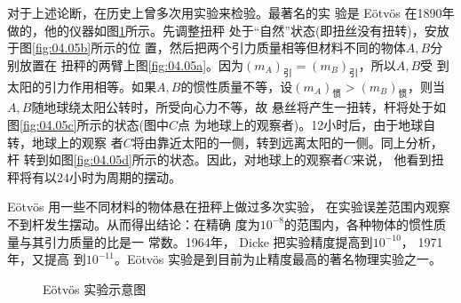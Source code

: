 对于上述论断，在历史上曾多次用实验来检验。最著名的实
验是 E\"otv\"os 在1890年做的，他的仪器如图\ref{fig:04.05}所示。先调整扭秤
处于“自然”状态(即扭丝没有扭转)，安放于图\ref{fig:04.05b}所示的位
置，然后把两个引力质量相等但材料不同的物体$ A, B $分别放置在
扭秤的两臂上\lhbrak 图\ref{fig:04.05a}\rhbrak 。因为$\left(m _ { A }\right) _ {\text{引}} = \left(m _ { B }\right) _ {\text{引}} $，所以$ A , B $受
到太阳的引力作用相等。如果$ A , B $的惯性质量不等，设$  \left(m _ { A }\right) _ {\text{惯}}  > \left(m _ { B }\right) _ {\text{惯}} $，则当$ A , B $随地球绕太阳公转时，所受向心力不等，故
悬丝将产生一扭转，杆将处于如图\ref{fig:04.05c}所示的状态(图中$ C $点
为地球上的观察者)。12小时后，由于地球自转，地球上的观察
者$ C $将由靠近太阳的一侧，转到远离太阳的一侧。同上分析，杆
转到如图\ref{fig:04.05d}所示的状态。因此，对地球上的观察者$ C $来说，
他看到扭秤将有以$ 24 $小时为周期的摆动。

E\"otv\"os 用一些不同材料的物体悬在扭秤上做过多次实验，
在实验误差范围内观察不到杆发生摆动。从而得出结论：在精确
度为$  1 0 ^ { - 8 }   $的范围内，各种物体的惯性质量与其引力质量的比是一
常数。1964年， Dicke 把实验精度提高到$  1 0 ^ { - 1 0 }  $， 1971 年，又提高
到$  1 0 ^ { - 1 1 }  $。E\"otv\"os 实验是到目前为止精度最高的著名物理实验之一。
\begin{figure}[t]
  \centering
   \qquad
   \qquad
  \caption{E\"otv\"os 实验示意图}
  \label{fig:04.05}
  \vspace{-0.8em}
\end{figure}

